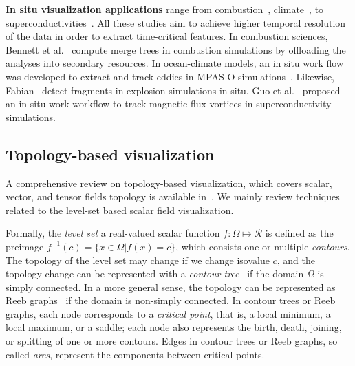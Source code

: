 

{\bf In situ visualization applications} range from combustion~\cite{YuWGCM10, BennettABGGJKKPPPTYZC12}, climate~\cite{WoodringPSPAH16}, to superconductivities~\cite{GuoPG17}.  All these studies aim to achieve higher temporal resolution of the data in order to extract time-critical features.
In combustion sciences, Bennett et al.~\cite{BennettABGGJKKPPPTYZC12} compute merge trees in combustion simulations by offloading the analyses into secondary resources.  
In ocean-climate models, an in situ work flow was developed to extract and track eddies in MPAS-O simulations~\cite{WoodringPSPAH16}.  
Likewise, Fabian~\cite{Fabian12} detect fragments in explosion simulations in situ.  
Guo et al.~\cite{GuoPG17} proposed an in situ work workflow to track magnetic flux vortices in superconductivity simulations.  





\subsection{Topology-based visualization}

A comprehensive review on topology-based visualization, which covers scalar, vector, and tensor fields topology is available in~\cite{HeineLHIFSHG16}.  We mainly review techniques related to the level-set based scalar field visualization.  

Formally, the \emph{level set} a real-valued scalar function $f: \Omega\mapsto\mathcal{R}$ is defined as the preimage $f^{-1}(c) = \{x\in\Omega | f(x) = c \}$, which consists one or multiple \emph{contours}.  The topology of the level set may change if we change isovalue $c$, and the topology change can be represented with a \emph{contour tree}~\cite{} if the domain $\Omega$ is simply connected.  In a more general sense, the topology can be represented as Reeb graphs~\cite{Reeb46} if the domain is non-simply connected.  In contour trees or Reeb graphs, each node corresponds to a \emph{critical point}, that is, a local minimum, a local maximum, or a saddle; each node also represents the birth, death, joining, or splitting of one or more contours.  Edges in contour trees or Reeb graphs, so called \emph{arcs}, represent the components between critical points. 

